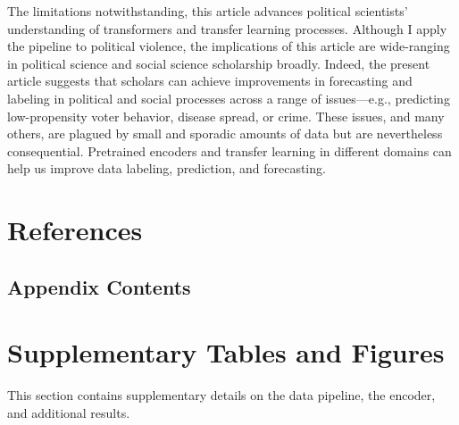 \documentclass[11pt, letterpaper]{article}
\begin{document}
The limitations notwithstanding, this article advances political scientists' understanding of transformers and transfer learning processes. Although I apply the pipeline to political violence, the implications of this article are wide-ranging in political science and social science scholarship broadly. Indeed, the present article suggests that scholars can achieve improvements in forecasting and labeling in political and social processes across a range of issues---e.g., predicting low-propensity voter behavior, disease spread, or crime. These issues, and many others, are plagued by small and sporadic amounts of data but are nevertheless consequential. Pretrained encoders and transfer learning in different domains can help us improve data labeling, prediction, and forecasting.

\section{References}




\newpage
\appendix


\renewcommand{\thetable}{\thesection\arabic{table}}
\renewcommand{\thefigure}{\thesection\arabic{figure}}
\ifdefined\theHtable {}\fi   %
\ifdefined\theHfigure \renewcommand{\theHfigure}{A\arabic{figure}}\fi
\startcontents[appendix]

\begin{singlespacing}

\section*{Appendix Contents}

\end{singlespacing}

\newpage
\section{Supplementary Tables and Figures}
\label{app:supp}
This section contains supplementary details on the data pipeline, the encoder, and additional results. %
\end{document}
